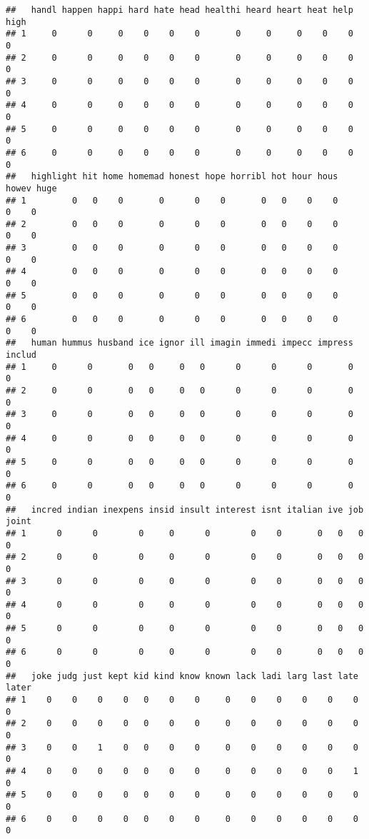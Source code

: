 \documentclass[]{article}
\begin{document}
\begin{verbatim}
##   handl happen happi hard hate head healthi heard heart heat help high
## 1     0      0     0    0    0    0       0     0     0    0    0    0
## 2     0      0     0    0    0    0       0     0     0    0    0    0
## 3     0      0     0    0    0    0       0     0     0    0    0    0
## 4     0      0     0    0    0    0       0     0     0    0    0    0
## 5     0      0     0    0    0    0       0     0     0    0    0    0
## 6     0      0     0    0    0    0       0     0     0    0    0    0
##   highlight hit home homemad honest hope horribl hot hour hous howev huge
## 1         0   0    0       0      0    0       0   0    0    0     0    0
## 2         0   0    0       0      0    0       0   0    0    0     0    0
## 3         0   0    0       0      0    0       0   0    0    0     0    0
## 4         0   0    0       0      0    0       0   0    0    0     0    0
## 5         0   0    0       0      0    0       0   0    0    0     0    0
## 6         0   0    0       0      0    0       0   0    0    0     0    0
##   human hummus husband ice ignor ill imagin immedi impecc impress includ
## 1     0      0       0   0     0   0      0      0      0       0      0
## 2     0      0       0   0     0   0      0      0      0       0      0
## 3     0      0       0   0     0   0      0      0      0       0      0
## 4     0      0       0   0     0   0      0      0      0       0      0
## 5     0      0       0   0     0   0      0      0      0       0      0
## 6     0      0       0   0     0   0      0      0      0       0      0
##   incred indian inexpens insid insult interest isnt italian ive job joint
## 1      0      0        0     0      0        0    0       0   0   0     0
## 2      0      0        0     0      0        0    0       0   0   0     0
## 3      0      0        0     0      0        0    0       0   0   0     0
## 4      0      0        0     0      0        0    0       0   0   0     0
## 5      0      0        0     0      0        0    0       0   0   0     0
## 6      0      0        0     0      0        0    0       0   0   0     0
##   joke judg just kept kid kind know known lack ladi larg last late later
## 1    0    0    0    0   0    0    0     0    0    0    0    0    0     0
## 2    0    0    0    0   0    0    0     0    0    0    0    0    0     0
## 3    0    0    1    0   0    0    0     0    0    0    0    0    0     0
## 4    0    0    0    0   0    0    0     0    0    0    0    0    1     0
## 5    0    0    0    0   0    0    0     0    0    0    0    0    0     0
## 6    0    0    0    0   0    0    0     0    0    0    0    0    0     0

\end{verbatim}
\end{document}
